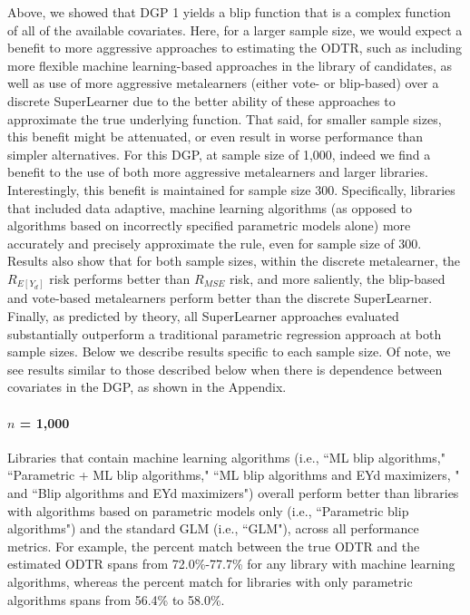 \documentclass[a4paper,12pt]{article}
\begin{document}
Above, we showed that DGP 1 yields a blip function that is a complex function of all of the available covariates. Here, for a larger sample size, we would expect a benefit to more aggressive approaches to estimating the ODTR, such as including more flexible machine learning-based approaches in the library of candidates, as well as use of more aggressive metalearners (either vote- or blip-based) over a discrete SuperLearner due to the better ability of these approaches to approximate the true underlying function. That said, for smaller sample sizes, this benefit might be attenuated, or even result in worse performance than simpler alternatives. For this DGP, at sample size of 1,000, indeed we find a benefit to the use of both more aggressive metalearners and larger libraries. Interestingly, this benefit is maintained for sample size 300. Specifically, libraries that included data adaptive, machine learning algorithms (as opposed to algorithms based on incorrectly specified parametric models alone) more accurately and precisely approximate the rule, even for sample size of 300. Results also show that for both sample sizes, within the discrete metalearner, the $R_{E[Y_d]}$ risk performs better than $R_{MSE}$ risk, and more saliently, the blip-based and vote-based metalearners perform better than the discrete SuperLearner. Finally, as predicted by theory, all SuperLearner approaches evaluated substantially outperform a traditional parametric regression approach at both sample sizes. Below we describe results specific to each sample size. Of note, we see results similar to those described below when there is dependence between covariates in the DGP, as shown in the Appendix.

\paragraph{$n$ = 1,000}

Libraries that contain machine learning algorithms (i.e., ``ML blip algorithms," ``Parametric + ML blip algorithms," ``ML blip algorithms and EYd maximizers, " and ``Blip algorithms and EYd maximizers") overall perform better than libraries with algorithms based on parametric models only (i.e., ``Parametric blip algorithms") and the standard GLM (i.e., ``GLM"), across all performance metrics. For example, the percent match between the true ODTR and the estimated ODTR spans from 72.0\%-77.7\% for any library with machine learning algorithms, whereas the percent match for libraries with only parametric algorithms spans from 56.4\% to 58.0\%. 
\end{document}
